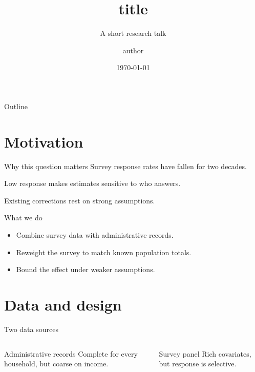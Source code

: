 \documentclass[aspectratio=169]{beamer}
\title{{{title}}}
\subtitle{A short research talk}
\author{{{author}}}
\institute{Department of Economics\\University Name}
\date{\today}
\begin{document}
\begin{frame}
  \titlepage
\end{frame}

\begin{frame}{Outline}
  \tableofcontents
\end{frame}

\section{Motivation}

\begin{frame}{Why this question matters}
  Survey response rates have fallen for two decades.

  \pause

  Low response makes estimates sensitive to who answers.

  \pause

  Existing corrections rest on strong assumptions.
\end{frame}

\begin{frame}{What we do}
  \begin{itemize}
    \item<1-> Combine survey data with administrative records.
    \item<2-> Reweight the survey to match known population totals.
    \item<3-> Bound the effect under weaker assumptions.
  \end{itemize}
\end{frame}

\section{Data and design}

\begin{frame}{Two data sources}
  \begin{columns}[T, onlytextwidth]
    \begin{block}{Administrative records}
      Complete for every household, but coarse on income.
    \end{block}

    \begin{block}{Survey panel}
      Rich covariates, but response is selective.
    \end{block}
  \end{columns}
\end{frame}
\end{document}
